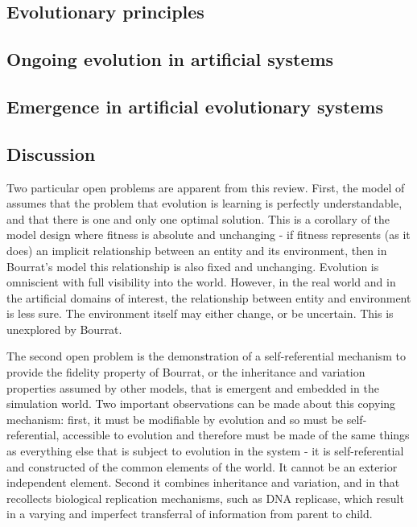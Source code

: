 \documentclass[]{report}
\begin{document}
\subsection{Evolutionary principles}
\subsection{Ongoing evolution in artificial systems}
\subsection{Emergence in artificial evolutionary systems}

\subsection{Discussion}

Two particular open problems are apparent from this review. First, the model of \cite{Bourrat2015} assumes that the problem that evolution is learning is perfectly understandable, and that there is one and only one optimal solution. This is a corollary of the model design where fitness is absolute and unchanging - if fitness represents (as it does) an implicit relationship between an entity and its environment, then in Bourrat's model this relationship is also fixed and unchanging. Evolution is omniscient with full visibility into the world. However, in the real world and in the artificial domains of interest, the relationship between entity and environment is less sure. The environment itself may either change, or be uncertain. This is unexplored by Bourrat.

The second open problem is the demonstration of a self-referential mechanism to provide the fidelity property of Bourrat, or the inheritance and variation properties assumed by other models, that is emergent and embedded in the simulation world. Two important observations can be made about this copying mechanism: first, it must be modifiable by evolution and so must be self-referential, accessible to evolution and therefore must be made of the same things as everything else that is subject to evolution in the system - it is self-referential and constructed of the common elements of the world. It cannot be an exterior independent element. Second it combines inheritance and variation, and in that recollects biological replication mechanisms, such as DNA replicase, which result in a varying and imperfect transferral of information from parent to child. 
\end{document}
